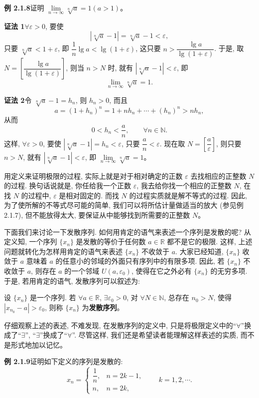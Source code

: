 \documentclass[UTF8, 12pt, fontset=fandol, oneside]{ctexart}
\begin{document}
\noindent\textbf{例 2.1.8}\quad 证明 $\lim\limits_{n\to\infty}\sqrt[n]{a}=1(a>1)$。

\noindent\textbf{证法 1}\quad $\forall\varepsilon>0$, 要使
\[
  |\sqrt[n]{a}-1|=\sqrt[n]{a}-1<\varepsilon,
\]
只要 $\sqrt[n]{a}<1+\varepsilon$, 即 $\dfrac1n\lg a<\lg(1+\varepsilon)$, 这只要 $n>\dfrac{\lg a}{\lg(1+\varepsilon)}$. 于是, 取 $N=\left[\dfrac{\lg a}{\lg(1+\varepsilon)}\right]$, 则当 $n>N$ 时, 就有 $|\sqrt[n]{a}-1|<\varepsilon$, 即
\[
  \lim_{n\to\infty}\sqrt[n]{a}=1.
\]

\noindent\textbf{证法 2}\quad 令 $\sqrt[n]{a}-1=h_n$, 则 $h_n>0$, 而且
\[
  a=(1+h_n)^n=1+nh_n+\cdots+(h_n)^n>nh_n,
\]
从而
\[
  0<h_n<\frac an,\qquad \forall n\in\mathbb{N}.
\]
这样, $\forall\varepsilon>0$, 要使 $|\sqrt[n]{a}-1|=h_n<\varepsilon$, 只要 $\dfrac an<\varepsilon$. 现在取 $N=\left[\dfrac a\varepsilon\right]$, 则只要 $n>N$, 就有 $|\sqrt[n]{a}-1|<\varepsilon$, 即 $\lim\limits_{n\to\infty}\sqrt[n]{a}=1$。

用定义来证明极限的过程, 实际上就是对于相对确定的正数 $\varepsilon$ 去找相应的正整数 $N$ 的过程. 换句话说就是, 你任给我一个正数 $\varepsilon$, 我去给你找一个相应的正整数 $N$, 在找 $N$ 的过程中, $\varepsilon$ 是相对固定的. 而找 $N$ 的过程实质就是解不等式的过程. 因此, 为了使所解的不等式尽可能的简单, 我们可以将所估计量做适当的放大 (参见例 2.1.7), 但不能放得太大, 要保证从中能够找到所需要的正整数 $N$。

下面我们来讨论一下发散序列. 如何用肯定的语气来表述一个序列是发散的呢? 从定义知, 一个序列 $\{x_n\}$ 是发散的等价于任何数 $a\in\mathbb{R}$ 都不是它的极限. 这样, 上述问题就转化为怎样用肯定的语气来表述 $\{x_n\}$ 不收敛于 $a$. 大家已经知道, $\{x_n\}$ 收敛于 $a$ 意味着 $a$ 的任意小的邻域的外面只有序列中的有限多项. 因此, 若 $\{x_n\}$ 不收敛于 $a$, 则存在 $a$ 的一个邻域 $U(a,\varepsilon_0)$, 使得在它之外必有 $\{x_n\}$ 的无穷多项. 于是, 若用肯定的语气, 发散序列可以叙述为:

设 $\{x_n\}$ 是一个序列. 若 $\forall a\in\mathbb{R}$, $\exists\varepsilon_0>0$, 对 $\forall N\in\mathbb{N}$, 总存在 $n_0>N$, 使得 $|x_{n_0}-a|>\varepsilon_0$, 则称 $\{x_n\}$ 为\textbf{发散序列}。

仔细观察上述的表述, 不难发现, 在发散序列的定义中, 只是将极限定义中的``$\forall$''换成了``$\exists$'', ``$\exists$''换成了``$\forall$''. 尽管这样, 我们还是希望读者能理解这样表述的实质, 而不是形式地加以记忆。

\noindent\textbf{例 2.1.9}\quad 证明如下定义的序列是发散的:
\[
  x_n=
  \begin{cases}
    \dfrac1n, & n=2k-1,\\
    n, & n=2k,
  \end{cases}
  \qquad k=1,2,\cdots .
\]
\end{document}
